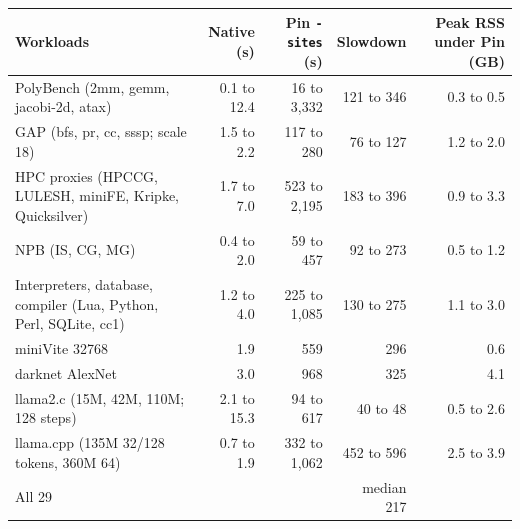 \begin{tabular}{lrrrr}
\toprule
Workloads & Native (s) & Pin \texttt{-sites} (s) & Slowdown & Peak RSS under Pin (GB) \\
\midrule
PolyBench (2mm, gemm, jacobi-2d, atax) & 0.1 to 12.4 & 16 to 3{,}332 & 121 to 346 & 0.3 to 0.5 \\
GAP (bfs, pr, cc, sssp; scale 18) & 1.5 to 2.2 & 117 to 280 & 76 to 127 & 1.2 to 2.0 \\
HPC proxies (HPCCG, LULESH, miniFE, Kripke, Quicksilver) & 1.7 to 7.0 & 523 to 2{,}195 & 183 to 396 & 0.9 to 3.3 \\
NPB (IS, CG, MG) & 0.4 to 2.0 & 59 to 457 & 92 to 273 & 0.5 to 1.2 \\
Interpreters, database, compiler (Lua, Python, Perl, SQLite, cc1) & 1.2 to 4.0 & 225 to 1{,}085 & 130 to 275 & 1.1 to 3.0 \\
miniVite 32768 & 1.9 & 559 & 296 & 0.6 \\
darknet AlexNet & 3.0 & 968 & 325 & 4.1 \\
llama2.c (15M, 42M, 110M; 128 steps) & 2.1 to 15.3 & 94 to 617 & 40 to 48 & 0.5 to 2.6 \\
llama.cpp (135M 32/128 tokens, 360M 64) & 0.7 to 1.9 & 332 to 1{,}062 & 452 to 596 & 2.5 to 3.9 \\
\midrule
All 29 & & & median 217 & \\
\bottomrule
\end{tabular}
